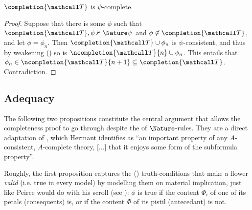 \begin{scope}
\begin{lemma}
  $\completion{\tT}$ is $\psi$-complete.
\end{lemma}
\begin{proof}
  Suppose that there is some $\phi$ such that $\completion{\tT}, \phi
  \nvdash{\Nature} \psi$ and $\phi \not\in \completion{\tT}$, and let $\phi =
  \phi_n$. Then $\completion{\tT} \cup \phi_n$ is $\psi$-consistent, and thus by
  weakening () so is $\ncompletion{\tT}{n} \cup \phi_n$. This
  entails that $\phi_n \in \ncompletion{\tT}{n+1} \subseteq \completion{\tT}$.
  Contradiction.
\end{proof}

\subsection{Adequacy}

The following two propositions constitute the central argument that allows the
completeness proof to go through despite the  of $\Nature$-rules.
They are a direct adaptation of \cite[Proposition 7]{hutchison_semantic_2005},
which Hermant identifies as ``an important property of any $A$-consistent,
$A$-complete theory, [...] that it enjoys some form of the subformula
property''.

Roughly, the first proposition captures the () truth-conditions
that make a flower \emph{valid} (i.e. true in every model) by modelling them on
material implication, just like Peirce would do with his scroll (see
): $\phi$ is true if the content $\Phi_i$ of one of its petals
(consequents) is, or if the content $\Phi$ of its pistil (antecedant) is not.

\begin{proposition}
  

\end{proposition}
\end{scope}
